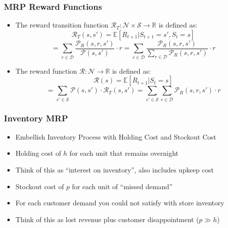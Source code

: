 \documentclass[handout]{beamer}
\begin{document}
\begin{frame}
\frametitle{MRP Reward Functions}
\pause
\begin{itemize}[<+->]
\item The reward transition function $\mathcal{R}_T: \mathcal{N} \times \mathcal{S} \rightarrow \mathbb{R}$ is defined as:
$$\mathcal{R}_T(s,s') = \mathbb{E}[R_{t+1}|S_{t+1}=s',S_t=s]$$
$$ = \sum_{r\in \mathcal{D}} \frac {\mathcal{P}_R(s,r,s')} {\mathcal{P}(s,s')} \cdot r = \sum_{r\in \mathcal{D}} \frac {\mathcal{P}_R(s,r,s')} {\sum_{r\in \mathcal{D}} \mathcal{P}_R(s,r,s')} \cdot r$$
\item The reward function $\mathcal{R}: \mathcal{N} \rightarrow \mathbb{R}$ is defined as:
$$\mathcal{R}(s) = \mathbb{E}[R_{t+1}|S_t=s]$$
$$ = \sum_{s' \in \mathcal{S}} \mathcal{P}(s,s') \cdot \mathcal{R}_T(s,s') = \sum_{s'\in \mathcal{S}} \sum_{r \in \mathcal{D}} \mathcal{P}_R(s,r,s') \cdot r$$
\end{itemize}
\end{frame}

\begin{frame}
\frametitle{Inventory MRP}
\pause
\begin{itemize}[<+->]
\item Embellish Inventory Process with Holding Cost and Stockout Cost
\item Holding cost of $h$ for each unit that remains overnight
\item Think of this as ``interest on inventory'', also includes upkeep cost
\item Stockout cost of $p$ for each unit of ``missed demand''
\item For each customer demand you could not satisfy with store inventory
\item Think of this as lost revenue plus customer disappointment ($p \gg h$)
\end{itemize}
\end{frame}
\end{document}
